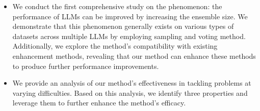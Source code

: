 \begin{itemize}
\item We conduct the first comprehensive study on the phenomenon: the performance of LLMs can be improved by increasing the ensemble size. We demonstrate that this phenomenon generally exists on various types of datasets across multiple LLMs by employing sampling and voting method. Additionally, we explore the method's compatibility with existing enhancement methods, revealing that our method can enhance these methods to produce further performance improvements.

\item We provide an analysis of our method's effectiveness in tackling problems at varying difficulties. Based on this analysis, we identify three properties and leverage them to further enhance the method's efficacy.
\end{itemize}


